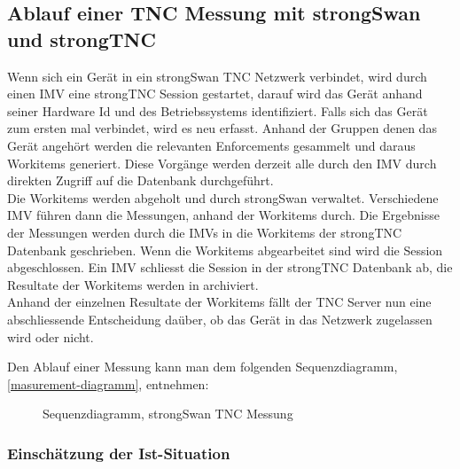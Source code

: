 \subsection{Ablauf einer TNC Messung mit strongSwan und strongTNC}
Wenn sich ein Gerät in ein strongSwan TNC Netzwerk verbindet, wird durch einen
IMV eine strongTNC Session gestartet, darauf wird das Gerät anhand seiner
Hardware Id und des Betriebssystems identifiziert. Falls sich das Gerät zum
ersten mal verbindet, wird es neu erfasst. Anhand der Gruppen denen das Gerät
angehört werden die relevanten Enforcements gesammelt und daraus Workitems
generiert. Diese Vorgänge werden derzeit alle durch den IMV durch direkten
Zugriff auf die Datenbank durchgeführt.\\
Die Workitems werden abgeholt und durch strongSwan verwaltet.
Verschiedene IMV führen dann die Messungen, anhand der Workitems durch. Die
Ergebnisse der Messungen werden durch die IMVs in die Workitems der strongTNC
Datenbank geschrieben. Wenn die Workitems abgearbeitet sind wird die Session
abgeschlossen. Ein IMV schliesst die Session in der strongTNC Datenbank ab,
die Resultate der Workitems werden in archiviert.\\
Anhand der einzelnen Resultate der Workitems fällt der TNC Server nun eine
abschliessende Entscheidung daüber, ob das Gerät in das Netzwerk zugelassen wird
oder nicht.

Den Ablauf einer Messung kann man dem folgenden Sequenzdiagramm,
\autoref{masurement-diagramm}, entnehmen:
\begin{figure}[H]	
	\centering
	
	\caption{Sequenzdiagramm, strongSwan TNC Messung}
	\label{masurement-diagramm}
\end{figure}

\subsubsection{Einschätzung der Ist-Situation}
\label{analyse:einschaezung}


